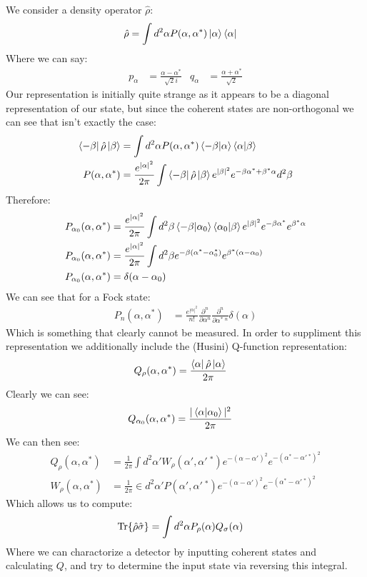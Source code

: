 We consider a density operator $\hat{\rho}$:
\begin{align*}
	\hat{\rho} &= \int d^2\alpha P(\alpha,\alpha^*)\ket{\alpha}\bra{\alpha}
\end{align*}
Where we can say:
\begin{align*}
	p_\alpha &= \frac{\alpha - \alpha^*}{\sqrt{2}i} &
	q_\alpha &= \frac{\alpha + \alpha^*}{\sqrt{2}}
\end{align*}
Our representation is initially quite strange as it appears to be a diagonal representation of our state, but since the coherent states are non-orthogonal we can see that isn't exactly the case:
\begin{align*}
	\bra{-\beta}\hat{\rho}\ket{\beta} &= \int d^2\alpha P(\alpha,\alpha^*) \bra{-\beta}\ket{\alpha}\bra{\alpha}\ket{\beta} \\
	P(\alpha,\alpha^*) &= \frac{e^{|\alpha|^2}}{2\pi}\int \bra{-\beta}\hat{\rho}\ket{\beta} e^{|\beta|^2} e^{-\beta\alpha^* + \beta^*\alpha} d^2\beta
\end{align*}
Therefore:
\begin{align*}
	P_{\alpha_0}(\alpha,\alpha^*) &= \frac{e^{|\alpha|^2}}{2\pi} \int d^2\beta \bra{-\beta}\ket{\alpha_0}\bra{\alpha_0}\ket{\beta} e^{|\beta|^2} e^{-\beta\alpha^*} e^{\beta^*\alpha} \\
	P_{\alpha_0}(\alpha,\alpha^*) &= \frac{e^{|\alpha|^2}}{2\pi} \int d^2\beta e^{-\beta(\alpha^*-\alpha_0^*)} e^{\beta^*(\alpha-\alpha_0)} \\
	P_{\alpha_0}(\alpha,\alpha^*) &= \delta(\alpha - \alpha_0)
\end{align*}
We can see that for a Fock state:
\begin{align*}
	P_n(\alpha,\alpha^*) &= \frac{e^{|\alpha|^2}}{n!} \frac{\partial^n}{\partial \alpha^n}\frac{\partial^n}{\partial\alpha^*\ ^n} \delta(\alpha)
\end{align*}
Which is something that clearly cannot be measured. In order to suppliment this representation we additionally include the (Husini) Q-function representation:
\begin{align*}
	Q_\rho(\alpha,\alpha^*) &= \frac{\bra{\alpha}\hat{\rho}\ket{\alpha}}{2\pi}
\end{align*}
Clearly we can see:
\begin{align*}
	Q_{\alpha_0}(\alpha,\alpha^*) &= \frac{|\bra{\alpha}\ket{\alpha_0}|^2}{2\pi}
\end{align*}
We can then see:
\begin{align*}
	Q_\rho(\alpha,\alpha^*) &= \frac{1}{2\pi} \int d^2\alpha' W_\rho(\alpha', \alpha'\ ^*) e^{-(\alpha - \alpha')^2} e^{-(\alpha^* - \alpha'\ ^*)^2} \\
	W_\rho(\alpha,\alpha^*) &= \frac{1}{2\pi} \in d^2\alpha' P(\alpha',\alpha'\ ^*) e^{-(\alpha-\alpha')^2} e^{-(\alpha^* - \alpha'\ ^*)^2}
\end{align*}
Which allows us to compute:
\begin{align*}
	\Tr{\hat{\rho}\hat{\sigma}} &= \int d^2\alpha P_\rho(\alpha)Q_\sigma(\alpha)
\end{align*}
Where we can charactorize a detector by inputting coherent states and calculating $Q$, and try to determine the input state via reversing this integral.
